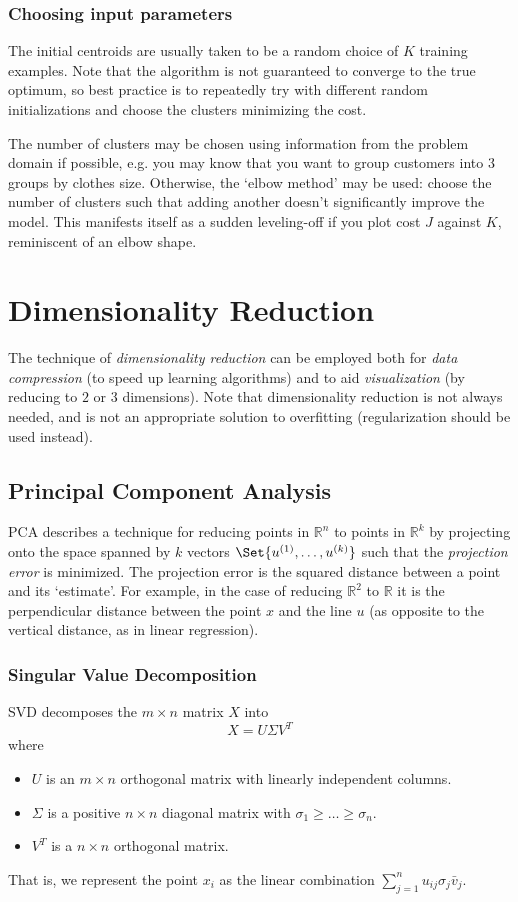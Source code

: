 \documentclass[a4paper,12pt]{article}
\theoremstyle{definition}
\newcommand{\R}{\mathbb{R}}
\begin{document}
\subsubsection{Choosing input parameters}
The initial centroids are usually taken to be a random choice of $K$ training examples. Note that the algorithm is not guaranteed to converge to the true optimum, so best practice is to repeatedly try with different random initializations and choose the clusters minimizing the cost.

The number of clusters may be chosen using information from the problem domain if possible, e.g. you may know that you want to group customers into 3 groups by clothes size. Otherwise, the `elbow method' may be used: choose the number of clusters such that adding another doesn't significantly improve the model. This manifests itself as a sudden leveling-off if you plot cost $J$ against $K$, reminiscent of an elbow shape.

\section{Dimensionality Reduction}
The technique of \emph{dimensionality reduction} can be employed both for \emph{data compression} (to speed up learning algorithms) and to aid \emph{visualization} (by reducing to $2$ or $3$ dimensions). Note that dimensionality reduction is not always needed, and is not an appropriate solution to overfitting (regularization should be used instead).

\subsection{Principal Component Analysis}
PCA describes a technique for reducing points in $\R^{n}$ to points in $\R^{k}$ by projecting onto the space spanned by $k$ vectors $\Set{u^{(1)}, \ldots, u^{(k)}}$ such that the \emph{projection error} is minimized. The projection error is the squared distance between a point and its `estimate'. For example, in the case of reducing $\R^2$ to $\R$ it is the perpendicular distance between the point $x$ and the line $u$ (as opposite to the vertical distance, as in linear regression).

\subsubsection{Singular Value Decomposition}
SVD decomposes the $m \times n$ matrix $X$ into
\[
X = U \Sigma V^T
\]
where
\begin{itemize}
\item $U$ is an $m \times n$ orthogonal matrix with linearly independent columns.
\item $\Sigma$ is a positive $n \times n$ diagonal matrix with $\sigma_{1} \geq \ldots \geq \sigma_{n}$.
\item $V^T$ is a $n \times n$ orthogonal matrix.
\end{itemize}
That is, we represent the point $x_i$ as the linear combination $\sum_{j = 1}^{n} u_{ij} \sigma_{j} \bar{v}_j$.
\end{document}
